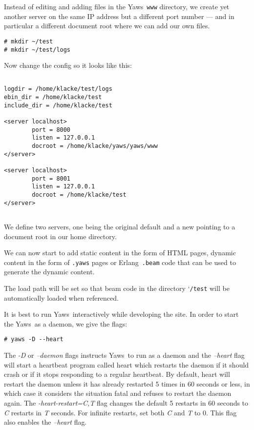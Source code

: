 \documentclass[11pt,oneside,english]{book}
\newcommand{\Erlang}            %
        {{\sc Erlang}}
\newcommand{\Yaws}            %
        {{\sc Yaws}}
\begin{document}
Instead of editing and adding files in the \Yaws\ \verb+www+
directory, we create yet another server on the same IP address but a
different port number --- and in particular a different document root
where we can add our own files.

\begin{verbatim}
# mkdir ~/test
# mkdir ~/test/logs
\end{verbatim}

Now change the config so it looks like this:

\begin{verbatim}

logdir = /home/klacke/test/logs
ebin_dir = /home/klacke/test
include_dir = /home/klacke/test

<server localhost>
        port = 8000
        listen = 127.0.0.1
        docroot = /home/klacke/yaws/yaws/www
</server>

<server localhost>
        port = 8001
        listen = 127.0.0.1
        docroot = /home/klacke/test
</server>


\end{verbatim}

We define two servers, one being the original default
and a new pointing to a document root in our home directory.

We can now start to add static content in the form of HTML pages,
dynamic content in the form of \verb+.yaws+ pages or
\Erlang\ \verb+.beam+ code that can be used to generate the dynamic
content.

The load path will be set so that beam code in the directory
\char`\~\verb+/test+ will be automatically loaded when referenced.

It is best to run \Yaws\  interactively while developing the site.
In order to start the \Yaws\  as a daemon, we give the flags:
\begin{verbatim}
# yaws -D --heart
\end{verbatim}

The \textit{-D} or \textit{--daemon} flags instructs \Yaws\ to run as
a daemon and the \textit{--heart} flag will start a heartbeat program
called heart which restarts the daemon if it should crash or if it
stops responding to a regular heartbeat. By default, heart will
restart the daemon unless it has already restarted 5 times in 60
seconds or less, in which case it considers the situation fatal and
refuses to restart the daemon again. The \textit{-heart-restart=C,T}
flag changes the default 5 restarts in 60 seconds to \textit{C}
restarts in \textit{T} seconds. For infinite restarts, set both
\textit{C} and \textit{T} to 0. This flag also enables the
\textit{--heart} flag.
\end{document}
